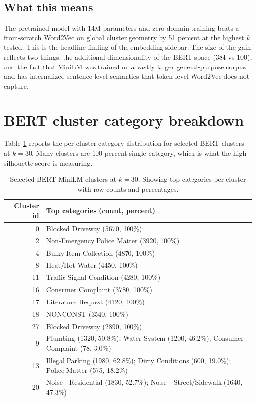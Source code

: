 \documentclass[11pt,letterpaper]{book}
\begin{document}
\subsection*{What this means}

The pretrained model with 14M parameters and zero domain training beats a from-scratch Word2Vec on global cluster geometry by 51 percent at the highest $k$ tested. This is the headline finding of the embedding sidebar. The size of the gain reflects two things: the additional dimensionality of the BERT space (384 vs 100), and the fact that MiniLM was trained on a vastly larger general-purpose corpus and has internalized sentence-level semantics that token-level Word2Vec does not capture.

\section{BERT cluster category breakdown}
\label{sec:results-bert-clusters}

Table \ref{tab:bert-cluster-breakdown} reports the per-cluster category distribution for selected BERT clusters at $k = 30$. Many clusters are 100 percent single-category, which is what the high silhouette score is measuring.

\begin{table}[h]
  \caption{Selected BERT MiniLM clusters at $k = 30$. Showing top categories per cluster with row counts and percentages.}
  \label{tab:bert-cluster-breakdown}
  \centering
  \small
  \begin{tabular}{rl}
    \toprule
    Cluster id & Top categories (count, percent) \\
    \midrule
    0  & Blocked Driveway (5670, 100\%) \\
    2  & Non-Emergency Police Matter (3920, 100\%) \\
    4  & Bulky Item Collection (4870, 100\%) \\
    8  & Heat/Hot Water (4450, 100\%) \\
    11 & Traffic Signal Condition (4280, 100\%) \\
    16 & Consumer Complaint (3780, 100\%) \\
    17 & Literature Request (4120, 100\%) \\
    18 & NONCONST (3540, 100\%) \\
    27 & Blocked Driveway (2890, 100\%) \\
    9  & Plumbing (1320, 50.8\%); Water System (1200, 46.2\%); Consumer Complaint (78, 3.0\%) \\
    13 & Illegal Parking (1980, 62.8\%); Dirty Conditions (600, 19.0\%); Police Matter (575, 18.2\%) \\
    20 & Noise - Residential (1830, 52.7\%); Noise - Street/Sidewalk (1640, 47.3\%) \\
    \bottomrule
  \end{tabular}
\end{table}
\end{document}
